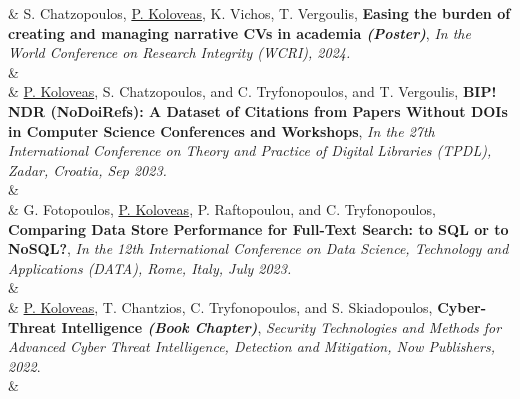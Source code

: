 %
\nohyphens{\color{gray}{Publications}} 
& S. Chatzopoulos, \underline{P. Koloveas}, K. Vichos, T. Vergoulis, \textbf{Easing the burden of creating and managing narrative CVs in academia \textit{(Poster)}}, \textit{In the World Conference on Research Integrity (WCRI), 2024.} \\
& \\ [-5pt]

& \underline{P. Koloveas}, S. Chatzopoulos, and C. Tryfonopoulos, and T. Vergoulis, \textbf{BIP! NDR (NoDoiRefs): A Dataset of Citations from Papers Without DOIs in Computer Science Conferences and Workshops}, \textit{In the 27th International Conference on Theory and Practice of Digital Libraries (TPDL), Zadar, Croatia, Sep 2023.} \\
&  \\ [-5pt]


& G. Fotopoulos, \underline{P. Koloveas}, P. Raftopoulou, and C. Tryfonopoulos, \textbf{Comparing Data Store Performance for Full-Text Search: to SQL or to NoSQL?}, \textit{In the 12th International Conference on Data Science, Technology and Applications (DATA), Rome, Italy, July 2023.} \\
& \\[-5pt]


& \underline{P. Koloveas}, T. Chantzios, C. Tryfonopoulos, and S. Skiadopoulos, \textbf{Cyber-Threat Intelligence \textit{(Book Chapter)}}, \textit{Security Technologies and Methods for Advanced Cyber Threat Intelligence, Detection and Mitigation, Now Publishers, 2022}. \\
& \\ [-5pt]


